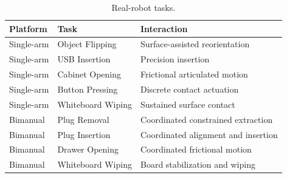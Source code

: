 \begin{table}[t]
    \centering
    \small
    \setlength{\tabcolsep}{3pt}
    \caption{Real-robot tasks.}
    \label{tab:tasks}
    \begin{tabularx}{\columnwidth}{ll>{\raggedright\arraybackslash}X}
        \toprule
        \textbf{Platform} & \textbf{Task} & \textbf{Interaction} \\
        \midrule
        Single-arm & Object Flipping & Surface-assisted reorientation \\
        Single-arm & USB Insertion & Precision insertion \\
        Single-arm & Cabinet Opening & Frictional articulated motion \\
        Single-arm & Button Pressing & Discrete contact actuation \\
        Single-arm & Whiteboard Wiping & Sustained surface contact \\
        \midrule
        Bimanual & Plug Removal & Coordinated constrained extraction \\
        Bimanual & Plug Insertion & Coordinated alignment and insertion \\
        Bimanual & Drawer Opening & Coordinated frictional motion \\
        Bimanual & Whiteboard Wiping & Board stabilization and wiping \\
        \bottomrule
    \end{tabularx}
\end{table}
